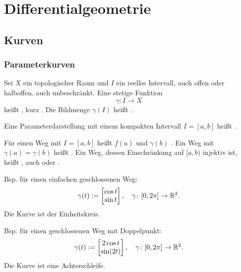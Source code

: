 
\chapter{Differentialgeometrie}
\section{Kurven}
\subsection{Parameterkurven}

\begin{definition}\mbox{}\newline
Sei $X$ ein topologischer Raum und
$I$ ein reelles Intervall, auch offen oder halboffen, auch unbeschränkt.
Eine stetige Funktion%
\begin{equation}\label{eq:Parameterkurve}
\gamma\colon I\to X
\end{equation}
heißt , kurz
. Die Bildmenge $\gamma(I)$ heißt .

Eine Parameterdarstellung mit einem kompakten Intervall $I=[a,b]$
heißt .

Für einen Weg mit $I=[a,b]$ heißt $f(a)$ 
und $\gamma(b)$ . Ein Weg mit $\gamma(a)=\gamma(b)$
heißt . Ein Weg, dessen Einschränkung auf $[a,b)$
injektiv ist, heißt , auch  oder
.
\end{definition}

\noindent
{}

Bsp. für einen einfachen geschlossenen Weg:
\begin{equation}
\gamma(t):=\begin{bmatrix}
\cos t\\
\sin t
\end{bmatrix},\quad
\gamma\colon [0,2\pi]\to \mathbb R^2.
\end{equation}
Die Kurve ist der Einheitskreis.

Bsp. für einen geschlossenen Weg mit Doppelpunkt:
\begin{equation}
\gamma(t):=\begin{bmatrix}
2\cos t\\
\sin(2t)
\end{bmatrix},\quad
\gamma\colon [0,2\pi]\to \mathbb R^2.
\end{equation}
Die Kurve ist eine Achterschleife.

